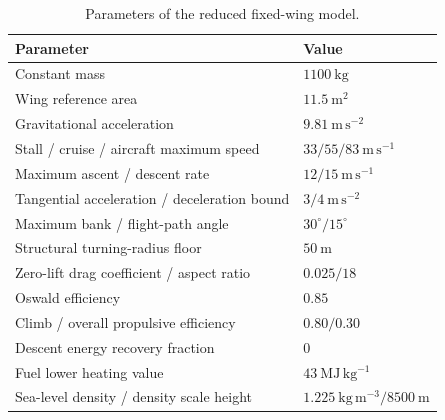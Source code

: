 \begin{table}[t]
 \centering
 \caption{Parameters of the reduced fixed-wing model.}
 \label{tab:aircraft}
 \small
 \begin{tabular}{ll}
 \hline
 Parameter & Value \\
 \hline
 Constant mass & $1100~\mathrm{kg}$ \\
 Wing reference area & $11.5~\mathrm{m^2}$ \\
 Gravitational acceleration & $9.81~\mathrm{m\,s^{-2}}$ \\
 Stall / cruise / aircraft maximum speed & $33 / 55 / 83~\mathrm{m\,s^{-1}}$ \\
 Maximum ascent / descent rate & $12 / 15~\mathrm{m\,s^{-1}}$ \\
 Tangential acceleration / deceleration bound & $3 / 4~\mathrm{m\,s^{-2}}$ \\
 Maximum bank / flight-path angle & $30^\circ / 15^\circ$ \\
 Structural turning-radius floor & $50~\mathrm{m}$ \\
 Zero-lift drag coefficient / aspect ratio & $0.025 / 18$ \\
 Oswald efficiency & $0.85$ \\
 Climb / overall propulsive efficiency & $0.80 / 0.30$ \\
 Descent energy recovery fraction & $0$ \\
 Fuel lower heating value & $43~\mathrm{MJ\,kg^{-1}}$ \\
 Sea-level density / density scale height & $1.225~\mathrm{kg\,m^{-3}} / 8500~\mathrm{m}$ \\
 \hline
 \end{tabular}
\end{table}

